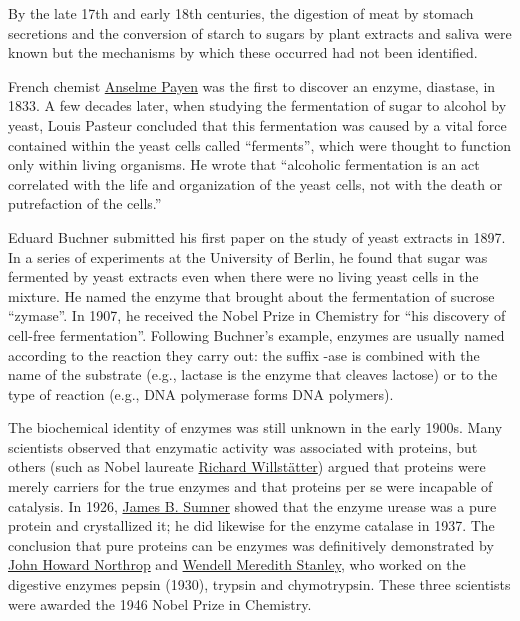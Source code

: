 By the late 17th and early 18th centuries, the digestion of meat by stomach secretions and the conversion of starch to sugars by plant extracts and saliva were known but the mechanisms by which these occurred had not been identified.

French chemist \href{https://en.wikipedia.org/wiki/Anselme_Payen}{Anselme Payen} was the first to discover an enzyme, diastase, in 1833. A few decades later, when studying the fermentation of sugar to alcohol by yeast, Louis Pasteur concluded that this fermentation was caused by a vital force contained within the yeast cells called ``ferments'', which were thought to function only within living organisms. He wrote that ``alcoholic fermentation is an act correlated with the life and organization of the yeast cells, not with the death or putrefaction of the cells.''

Eduard Buchner submitted his first paper on the study of yeast extracts in 1897. In a series of experiments at the University of Berlin, he found that sugar was fermented by yeast extracts even when there were no living yeast cells in the mixture. He named the enzyme that brought about the fermentation of sucrose ``zymase''. In 1907, he received the Nobel Prize in Chemistry for ``his discovery of cell-free fermentation''. Following Buchner's example, enzymes are usually named according to the reaction they carry out: the suffix -ase is combined with the name of the substrate (e.g., lactase is the enzyme that cleaves lactose) or to the type of reaction (e.g., DNA polymerase forms DNA polymers).

The biochemical identity of enzymes was still unknown in the early 1900s. Many scientists observed that enzymatic activity was associated with proteins, but others (such as Nobel laureate \href{https://en.wikipedia.org/wiki/Richard_Willstätter}{Richard Willstätter}) argued that proteins were merely carriers for the true enzymes and that proteins per se were incapable of catalysis. In 1926, \href{https://en.wikipedia.org/wiki/James_B._Sumner}{James B. Sumner} showed that the enzyme urease was a pure protein and crystallized it; he did likewise for the enzyme catalase in 1937. The conclusion that pure proteins can be enzymes was definitively demonstrated by \href{https://en.wikipedia.org/wiki/John_Howard_Northrop}{John Howard Northrop} and \href{https://en.wikipedia.org/wiki/Wendell_Meredith_Stanley}{Wendell Meredith Stanley}, who worked on the digestive enzymes pepsin (1930), trypsin and chymotrypsin. These three scientists were awarded the 1946 Nobel Prize in Chemistry.

